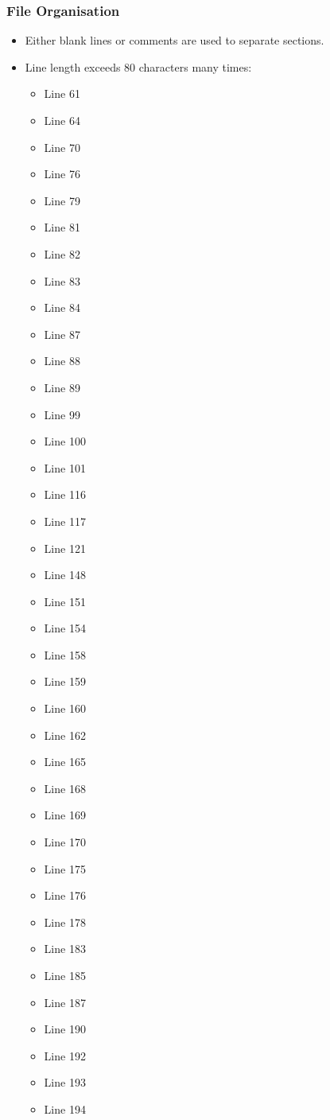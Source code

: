 \subsubsection{File Organisation}
\begin{itemize}
\item Either blank lines or comments are used to separate sections.
\item Line length exceeds 80 characters many times:
\begin{itemize}
\item Line 61 
\item Line 64
\item Line 70
\item Line 76
\item Line 79
\item Line 81
\item Line 82
\item Line 83
\item Line 84
\item Line 87
\item Line 88
\item Line 89
\item Line 99
\item Line 100
\item Line 101
\item Line 116
\item Line 117
\item Line 121
\item Line 148
\item Line 151
\item Line 154
\item Line 158
\item Line 159
\item Line 160
\item Line 162
\item Line 165
\item Line 168
\item Line 169
\item Line 170
\item Line 175
\item Line 176
\item Line 178
\item Line 183
\item Line 185
\item Line 187
\item Line 190
\item Line 192
\item Line 193
\item Line 194

\end{itemize}
\end{itemize}
